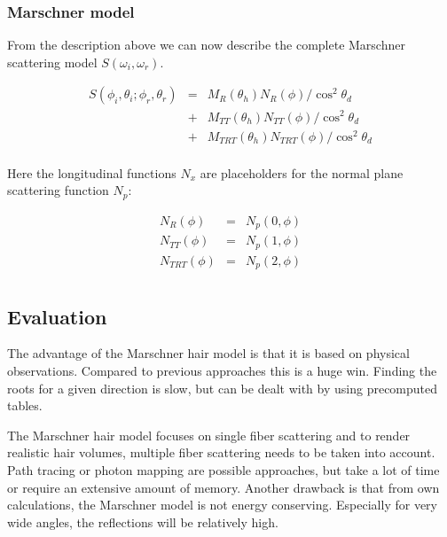 \documentclass[11pt,a4paper]{report}
\begin{document}
\subsubsection{Marschner model}

From the description above we can now describe the complete Marschner scattering model $S(\omega_i, \omega_r)$.

\begin{eqnarray*}
S(\phi_i,\theta_i; \phi_r, \theta_r) & = & M_R(\theta_h) N_R(\phi) / \cos^2 \theta_d \\
& + & M_{TT}(\theta_h) N_{TT}(\phi) / \cos^2 \theta_d \\
& + & M_{TRT}(\theta_h) N_{TRT}(\phi) / \cos^2 \theta_d \\
\end{eqnarray*}

Here the longitudinal functions $N_x$ are placeholders for the normal plane scattering function $N_p$:

\begin{eqnarray*}
N_R(\phi) & = & N_p(0, \phi) \\
N_{TT}(\phi) & = & N_p(1, \phi) \\
N_{TRT}(\phi) & = & N_p(2, \phi) \\
\end{eqnarray*}
\subsection{Evaluation}

The advantage of the Marschner hair model is that it is based on physical observations. Compared to previous approaches this is a huge win. Finding the roots for a given direction is slow, but can be dealt with by using precomputed tables.

The Marschner hair model focuses on single fiber scattering and to render realistic hair volumes, multiple fiber scattering needs to be taken into account. Path tracing or photon mapping are possible approaches, but take a lot of time or require an extensive amount of memory. Another drawback is that from own calculations, the Marschner model is not energy conserving. Especially for very wide angles, the reflections will be relatively high.

%
%


\end{document}
